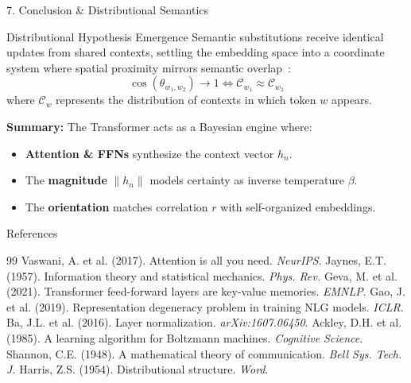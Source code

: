 \documentclass[aspectratio=169, 11pt]{beamer}
\begin{document}
\begin{frame}{7. Conclusion \& Distributional Semantics}
    \begin{block}{Distributional Hypothesis Emergence}
        Semantic substitutions receive identical updates from shared contexts, settling the embedding space into a coordinate system where spatial proximity mirrors semantic overlap~\cite{harris_distributional_1954}:
        $$\cos(\theta_{w_1, w_2}) \to 1 \iff \mathcal{C}_{w_1} \approx \mathcal{C}_{w_2}$$
        where $\mathcal{C}_w$ represents the distribution of contexts in which token $w$ appears.
    \end{block}
    
    \vspace{0.1cm}
    \textbf{Summary:} The Transformer acts as a Bayesian engine where:
    \begin{itemize}
        \item \textbf{Attention \& FFNs} synthesize the context vector $h_n$.
        \item The \textbf{magnitude} $\|h_n\|$ models certainty as inverse temperature $\beta$.
        \item The \textbf{orientation} matches correlation $r$ with self-organized embeddings.
    \end{itemize}
\end{frame}

\begin{frame}{References}
    \begin{thebibliography}{99}
        \tiny
         Vaswani, A. et al. (2017). Attention is all you need. \textit{NeurIPS}.
         Jaynes, E.T. (1957). Information theory and statistical mechanics. \textit{Phys. Rev.}
         Geva, M. et al. (2021). Transformer feed-forward layers are key-value memories. \textit{EMNLP}.
         Gao, J. et al. (2019). Representation degeneracy problem in training NLG models. \textit{ICLR}.
         Ba, J.L. et al. (2016). Layer normalization. \textit{arXiv:1607.06450}.
         Ackley, D.H. et al. (1985). A learning algorithm for Boltzmann machines. \textit{Cognitive Science}.
         Shannon, C.E. (1948). A mathematical theory of communication. \textit{Bell Sys. Tech. J.}
         Harris, Z.S. (1954). Distributional structure. \textit{Word}.
    \end{thebibliography}
\end{frame}
\end{document}
